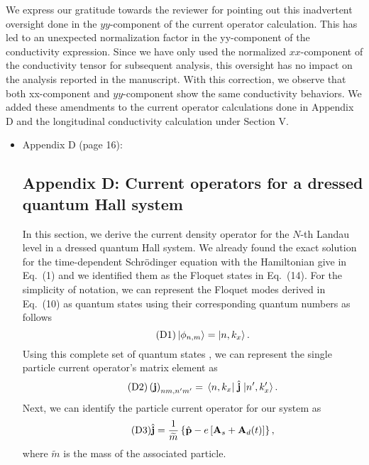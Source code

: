 \documentclass{article}
\begin{document}
We express our gratitude towards the reviewer for pointing out this inadvertent oversight done in the $yy$-component of the current operator calculation. This has led to an unexpected normalization factor in the yy-component of the  conductivity expression. Since we have only used the normalized $xx$-component of the conductivity tensor for subsequent analysis, this oversight has no impact on the analysis reported in the  manuscript. With this correction, we observe that both xx-component and $yy$-component show the same conductivity behaviors. We added these amendments to the current operator calculations done in Appendix D and the longitudinal conductivity calculation under Section V.

\begin{itemize}
  \item Appendix D (page 16):\\
  {\color{Red}
  \subsection*{\label{appendix_d}Appendix D: Current operators for a dressed quantum Hall system}

  In this section, we derive the current density operator for the $N$-th Landau level in a dressed quantum Hall system. We already found the exact solution for the time-dependent Schrödinger equation with the Hamiltonian give in Eq.~(1) and we identified them as the Floquet states in Eq.~(14). For the simplicity of notation, we can represent the Floquet modes derived in Eq.~(10) as quantum states using their corresponding quantum numbers as follows
  \begin{equation} \tag{D1}
    \ket{\phi_{n,m}} = \ket{n,k_x}.
  \end{equation}
  Using this complete set of quantum states \cite{wackerl20,holthaus15,grifoni98}, we can represent the single particle current operator's matrix element as
  \begin{equation} \tag{D2}
    \left(\vb{j} \right)_{nm,n'm'} = \mel{n,k_x}{\;\hat{\vb{j}}\;}{n',k'_x}.
  \end{equation}
  Next, we can identify the particle current operator for our system \cite{mahan00,bruus04} as
  \begin{equation} \tag{D3}
    \hat{\vb{j}} = \frac{1}{\widetilde{m}} \left\{\hat{\vb{p}} - e\left[\vb{A}_s + \vb{A}_d(t) \right]\right\},
  \end{equation}
  where $\widetilde{m}$ is the mass of the associated particle.

}
\end{itemize}
\end{document}

